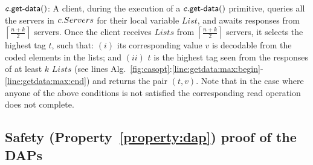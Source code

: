 	$\dagetdata{c}$:	A  client, during the execution of a  $\dagetdata{c}$ primitive, queries all the servers in $c.Servers$ for their  local variable $List$, and awaits responses from $\left\lceil \frac{n+k}{2} \right\rceil$ servers. Once the client receives $Lists$ from $\left\lceil \frac{n+k}{2} \right\rceil$ servers,  it selects the highest  tag $t$, such that: $(i)$ its corresponding value $v$ is decodable from the coded elements in the lists; and $(ii)$ $t$ is the highest tag seen from the responses of at least $k$ $Lists$ 
			(see lines Alg.~\ref{fig:casopt}:\ref{line:getdata:max:begin}-\ref{line:getdata:max:end}) and returns the pair $(t, v)$. 
Note that in the case where anyone of the above conditions is not satisfied the corresponding read operation does not complete.
%
%
%

\subsection{Safety (Property~\ref{property:dap})  proof of the DAP{s}}
\label{sec:safety:daps}
